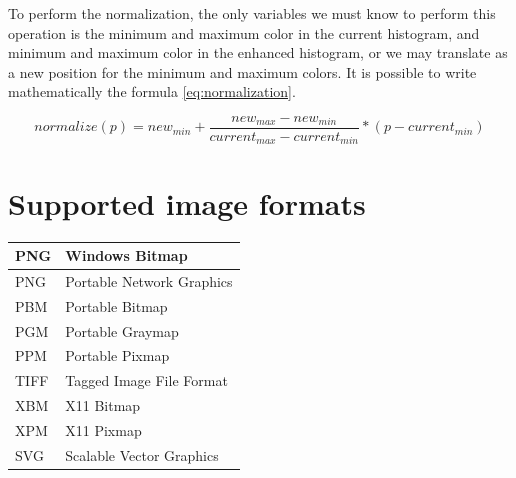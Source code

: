 \documentclass{article}
\begin{document}
		To perform the normalization, the only variables we must know to perform this operation is the minimum and maximum color in the current histogram, 
		and minimum and maximum color in the enhanced histogram, or we may translate as a new position for the minimum and maximum colors. It is possible
		to write mathematically the formula \ref{eq:normalization}.


		\begin{equation}
			normalize(p)=new_{min}+\frac{new_{max}-new_{min}}{current_{max}-current_{min}}*(p-current_{min})
			\label{eq:normalization}
		\end{equation}
		
		
\section{Supported image formats}


		\begin{center}
		    \begin{tabular}{ | l | l |}
		    \hline
		    	PNG & Windows Bitmap \\ \hline
			PNG & Portable Network Graphics\\ \hline
			PBM & Portable Bitmap\\ \hline
			PGM & Portable Graymap\\ \hline
			PPM & Portable Pixmap\\ \hline
			TIFF & Tagged Image File Format\\ \hline
			XBM & X11 Bitmap\\ \hline
			XPM & X11 Pixmap\\ \hline
			SVG & Scalable Vector Graphics\\ \hline
		    \end{tabular}
\end{center}
\end{document}
